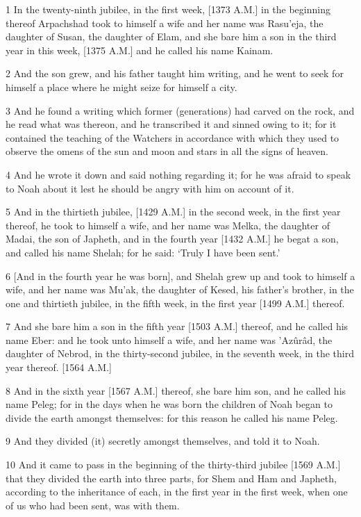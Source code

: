 \par 1 In the twenty-ninth jubilee, in the first week, [1373 A.M.] in the beginning thereof Arpachshad took to himself a wife and her name was Rasu'eja, the daughter of Susan, the daughter of Elam, and she bare him a son in the third year in this week, [1375 A.M.] and he called his name Kainam.
\par 2 And the son grew, and his father taught him writing, and he went to seek for himself a place where he might seize for himself a city.
\par 3 And he found a writing which former (generations) had carved on the rock, and he read what was thereon, and he transcribed it and sinned owing to it; for it contained the teaching of the Watchers in accordance with which they used to observe the omens of the sun and moon and stars in all the signs of heaven.
\par 4 And he wrote it down and said nothing regarding it; for he was afraid to speak to Noah about it lest he should be angry with him on account of it.
\par 5 And in the thirtieth jubilee, [1429 A.M.] in the second week, in the first year thereof, he took to himself a wife, and her name was Melka, the daughter of Madai, the son of Japheth, and in the fourth year [1432 A.M.] he begat a son, and called his name Shelah; for he said: ‘Truly I have been sent.’
\par 6 [And in the fourth year he was born], and Shelah grew up and took to himself a wife, and her name was Mu'ak, the daughter of Kesed, his father's brother, in the one and thirtieth jubilee, in the fifth week, in the first year [1499 A.M.] thereof.
\par 7 And she bare him a son in the fifth year [1503 A.M.] thereof, and he called his name Eber: and he took unto himself a wife, and her name was 'Azûrâd, the daughter of Nebrod, in the thirty-second jubilee, in the seventh week, in the third year thereof. [1564 A.M.]
\par 8 And in the sixth year [1567 A.M.] thereof, she bare him son, and he called his name Peleg; for in the days when he was born the children of Noah began to divide the earth amongst themselves: for this reason he called his name Peleg.
\par 9 And they divided (it) secretly amongst themselves, and told it to Noah.
\par 10 And it came to pass in the beginning of the thirty-third jubilee [1569 A.M.] that they divided the earth into three parts, for Shem and Ham and Japheth, according to the inheritance of each, in the first year in the first week, when one of us who had been sent, was with them.

